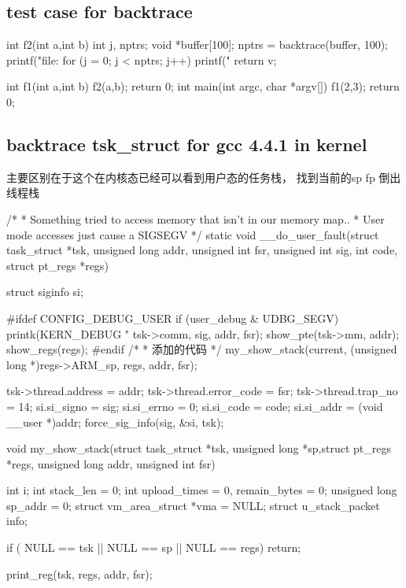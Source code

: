 \subsection{test case for backtrace}
\begin{code}
int f2(int a,int b)
{
    int j, nptrs;
    void *buffer[100];
    nptrs = backtrace(buffer, 100);
    printf("file:%
    for (j = 0; j < nptrs; j++)
        printf("%
    return v;
}

int f1(int a,int b)
{
    f2(a,b);
    return 0;
}
int main(int argc, char *argv[])
{
    f1(2,3);
    return 0;
}
\end{code}

\subsection{backtrace tsk\_struct for gcc 4.4.1 in kernel}
主要区别在于这个在内核态已经可以看到用户态的任务栈，
找到当前的sp fp 倒出线程栈
\begin{code}
/*
 * Something tried to access memory that isn't in our memory map..
 * User mode accesses just cause a SIGSEGV
 */
static void
__do_user_fault(struct task_struct *tsk, unsigned long addr,
		unsigned int fsr, unsigned int sig, int code,
		struct pt_regs *regs)
{
	struct siginfo si;

#ifdef CONFIG_DEBUG_USER
	if (user_debug & UDBG_SEGV) {
		printk(KERN_DEBUG "%
		       tsk->comm, sig, addr, fsr);
		show_pte(tsk->mm, addr);
		show_regs(regs);
	}
#endif
    /*
     *  添加的代码
     */
    my_show_stack(current, (unsigned long *)regs->ARM_sp, regs, addr, fsr);

	tsk->thread.address = addr;
	tsk->thread.error_code = fsr;
	tsk->thread.trap_no = 14;
	si.si_signo = sig;
	si.si_errno = 0;
	si.si_code = code;
	si.si_addr = (void __user *)addr;
	force_sig_info(sig, &si, tsk);
}
\end{code}


\begin{code}
void my_show_stack(struct task_struct *tsk, unsigned long *sp,struct pt_regs *regs, unsigned long addr, unsigned int fsr)
{
    int i;
    int stack_len = 0;
    int upload_times = 0, remain_bytes = 0;
    unsigned long sp_addr = 0;
    struct vm_area_struct *vma = NULL;
    struct u_stack_packet info;

    if ( NULL == tsk || NULL == sp || NULL == regs)
    {
        return;
    }
    
    print_reg(tsk, regs, addr, fsr);
}
\end{code}


